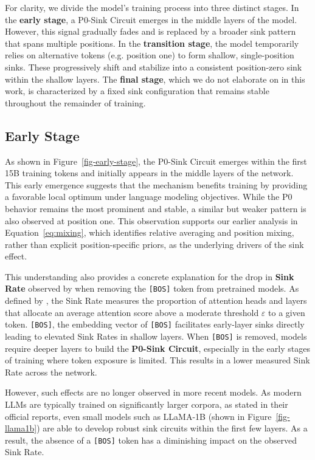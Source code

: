 \documentclass[]{template}
\theoremstyle{plain}
\theoremstyle{definition}
\theoremstyle{remark}
\begin{document}
For clarity, we divide the model’s training process into three distinct stages. In the \textbf{early stage}, a P0-Sink Circuit emerges in the middle layers of the model. However, this signal gradually fades and is replaced by a broader sink pattern that spans multiple positions. In the \textbf{transition stage}, the model temporarily relies on alternative tokens (e.g. position one) to form shallow, single-position sinks. These progressively shift and stabilize into a consistent position-zero sink within the shallow layers. The \textbf{final stage}, which we do not elaborate on in this work, is characterized by a fixed sink configuration that remains stable throughout the remainder of training.


\subsection{Early Stage}

As shown in Figure~\ref{fig-early-stage}, the P0-Sink Circuit emerges within the first 15B training tokens and initially appears in the middle layers of the network. This early emergence suggests that the mechanism benefits training by providing a favorable local optimum under language modeling objectives. While the P0 behavior remains the most prominent and stable, a similar but weaker pattern is also observed at position one. This observation supports our earlier analysis in Equation~\ref{eq:mixing}, which identifies relative averaging and position mixing, rather than explicit position-specific priors, as the underlying drivers of the sink effect.

This understanding also provides a concrete explanation for the drop in \textbf{Sink Rate} observed by \citet{barbero2025llmsattendtoken} when removing the \texttt{[BOS]} token from pretrained models. As defined by \citet{gu2025attentionsinkemergeslanguage}, the Sink Rate measures the proportion of attention heads and layers that allocate an average attention score above a moderate threshold $\varepsilon$ to a given token. \texttt{[BOS]}, the embedding vector of \texttt{[BOS]} facilitates early-layer sinks directly leading to elevated Sink Rates in shallow layers. When \texttt{[BOS]} is removed, models require deeper layers to build the \textbf{P0-Sink Circuit}, especially in the early stages of training where token exposure is limited. This results in a lower measured Sink Rate across the network.

However, such effects are no longer observed in more recent models. As modern LLMs are typically trained on significantly larger corpora, as stated in their official reports, even small models such as LLaMA-1B (shown in Figure~\ref{fig-llama1b}) are able to develop robust sink circuits within the first few layers. As a result, the absence of a \texttt{[BOS]} token has a diminishing impact on the observed Sink Rate.
\end{document}

